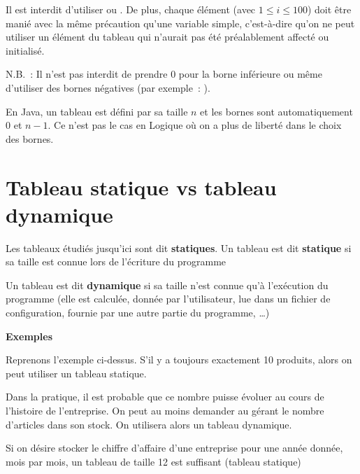 	
	Il est interdit d’utiliser  ou
	. De plus, chaque élément
	 (avec $1 \leq i \leq 100$) doit
	être manié avec la même précaution qu’une variable simple, c’est-à-dire
	qu’on ne peut utiliser un élément du tableau qui n’aurait pas été
	préalablement affecté ou initialisé.

	N.B.~: Il n'est pas interdit de prendre 0 pour la borne
	inférieure ou même d'utiliser des bornes négatives
	(par exemple~: ).

	En Java, un tableau est défini par sa taille $n$ et les bornes sont
	automatiquement $0$ et $n-1$. Ce n'est pas le cas en
	Logique où on a plus de liberté dans le choix des bornes.

\section{Tableau statique vs tableau dynamique}

	Les tableaux étudiés jusqu'ici sont dit \textbf{statiques}.
	Un tableau est dit \textbf{statique} si sa taille 
	est connue lors de l’écriture du programme

	Un tableau est dit \textbf{dynamique}
	si sa taille n’est connue qu’à l’exécution du programme (elle est
	calculée, donnée par l’utilisateur, lue dans un fichier de
	configuration, fournie par une autre partie du programme, \dots)


	\textbf{Exemples}

	\begin{liste}
	\item
		Reprenons l’exemple ci-dessus. 
		S’il y a toujours exactement 10 produits, 
		alors on peut utiliser un tableau statique. 
	\item
		Dans la pratique, il est probable que ce nombre puisse évoluer 
		au cours de l’histoire de l’entreprise.
		On peut au moins demander au gérant le nombre d'articles dans son stock.
		On utilisera alors un tableau dynamique.
	\item 
		Si on désire stocker le chiffre d’affaire d’une entreprise 
		pour une année donnée, mois par mois, un tableau de
		taille 12 est suffisant (tableau statique)
	
	\end{liste}
	
